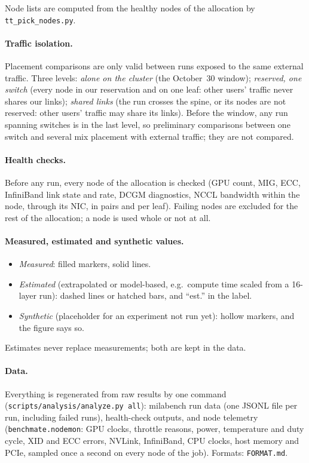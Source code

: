 Node lists are computed from the healthy nodes of the allocation by \texttt{tt\_pick\_nodes.py}.

\paragraph{Traffic isolation.} Placement comparisons are only valid between runs exposed to the same
external traffic. Three levels: \emph{alone on the cluster} (the October~30 window); \emph{reserved, one
switch} (every node in our reservation and on one leaf: other users' traffic never shares our links);
\emph{shared links} (the run crosses the spine, or its nodes are not reserved: other users' traffic may
share its links). Before the window, any run spanning switches is in the last level, so preliminary
comparisons between one switch and several mix placement with external traffic; they are not compared.

\paragraph{Health checks.} Before any run, every node of the allocation is checked (GPU count, MIG, ECC,
InfiniBand link state and rate, DCGM diagnostics, NCCL bandwidth within the node, through its NIC, in
pairs and per leaf). Failing nodes are excluded for the rest of the allocation; a node is used whole or
not at all.

\paragraph{Measured, estimated and synthetic values.}
\begin{itemize}[leftmargin=*, itemsep=1pt]
  \item \emph{Measured}: filled markers, solid lines.
  \item \emph{Estimated} (extrapolated or model-based, e.g.\ compute time scaled from a 16-layer run):
        dashed lines or hatched bars, and ``est.'' in the label.
  \item \emph{Synthetic} (placeholder for an experiment not run yet): hollow markers, and the figure says so.
\end{itemize}
Estimates never replace measurements; both are kept in the data.

\paragraph{Data.} Everything is regenerated from raw results by one command
(\texttt{scripts/analysis/analyze.py all}): milabench run data (one JSONL file per run, including failed
runs), health-check outputs, and node telemetry (\texttt{benchmate.nodemon}: GPU clocks, throttle reasons,
power, temperature and duty cycle, XID and ECC errors, NVLink, InfiniBand, CPU clocks, host memory and PCIe,
sampled once a second on every node of the job). Formats: \texttt{FORMAT.md}.
